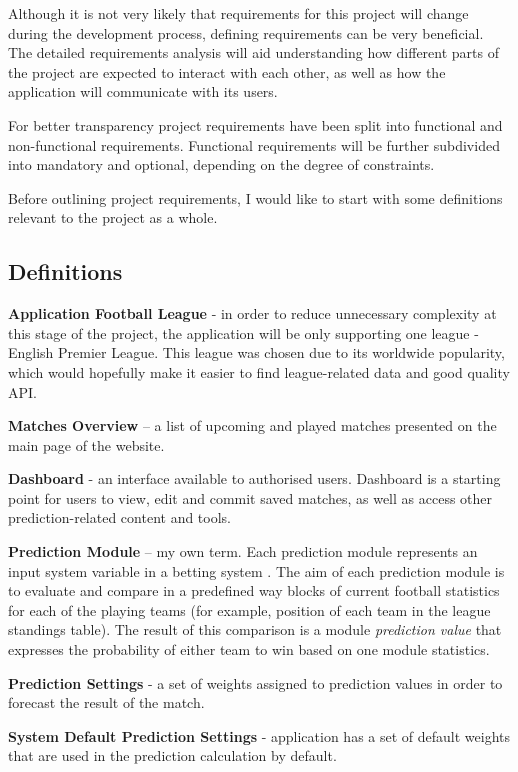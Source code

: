 Although it is not very likely that requirements for this project will change during the development process, defining requirements can be very beneficial. The detailed requirements analysis will aid understanding how different parts of the project are expected to interact with each other, as well as how the application will communicate with its users.

For better transparency project requirements have been split into functional and non-functional requirements. Functional requirements will be further subdivided into mandatory and optional, depending on the degree of constraints.

Before outlining project requirements, I would like to start with some definitions relevant to the project as a whole.

\subsection{Definitions}
\label{subsec:definitions_req}
\textbf{Application Football League} - in order to reduce unnecessary complexity at this stage of the project, the application will be only supporting one league - English Premier League. This league was chosen due to its worldwide popularity, which would hopefully make it easier to find league-related data and good quality API.

\textbf{Matches Overview} – a list of upcoming and played matches presented on the main page of the website.

\textbf{Dashboard} - an interface available to authorised users. Dashboard is a starting point for users to view, edit and commit saved matches, as well as access other prediction-related content and tools.

\textbf{Prediction Module} – my own term. Each prediction module represents an input system variable in a betting system    
 \citep{art:bettingsystemvariableparameters}. The aim of each prediction module is to evaluate and compare in a predefined way blocks of current football statistics for each of the playing teams (for example, position of each team in the league standings table). The result of this comparison is a module \emph{prediction value} that expresses the probability of either team to win based on one module statistics.

\textbf{Prediction Settings} - a set of weights assigned to prediction values in order to forecast the result of the match.

\textbf{System Default Prediction Settings} - application has a set of default weights that are used in the prediction calculation by default. 
 
